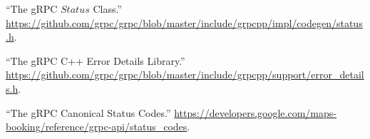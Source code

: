 \documentclass[11pt]{article}
\begin{document}
{{\begin{thebibliography}{45}
\mdbibitemlabel{{}[38]}\textquotedblleft{}The gRPC $Status$ Class.\textquotedblright{} \href{https://github.com/grpc/grpc/blob/master/include/grpcpp/impl/codegen/status.h}{{\ttfamily https://\hspace{0pt}github.\hspace{0pt}com/\hspace{0pt}grpc/\hspace{0pt}grpc/\hspace{0pt}blob/\hspace{0pt}master/\hspace{0pt}include/\hspace{0pt}grpcpp/\hspace{0pt}impl/\hspace{0pt}codegen/\hspace{0pt}status.\hspace{0pt}h}}.\label{grpcstatus}%

\mdbibitemlabel{{}[39]}\textquotedblleft{}The gRPC C++ Error Details Library.\textquotedblright{} \href{https://github.com/grpc/grpc/blob/master/include/grpcpp/support/error_details.h}{{\ttfamily https://\hspace{0pt}github.\hspace{0pt}com/\hspace{0pt}grpc/\hspace{0pt}grpc/\hspace{0pt}blob/\hspace{0pt}master/\hspace{0pt}include/\hspace{0pt}grpcpp/\hspace{0pt}support/\hspace{0pt}error\_\hspace{0pt}details.\hspace{0pt}h}}.\label{grpcerrordetails}%

\mdbibitemlabel{{}[40]}\textquotedblleft{}The gRPC Canonical Status Codes.\textquotedblright{} \href{https://developers.google.com/maps-booking/reference/grpc-api/status_codes}{{\ttfamily https://\hspace{0pt}developers.\hspace{0pt}google.\hspace{0pt}com/\hspace{0pt}maps-\hspace{0pt}booking/\hspace{0pt}reference/\hspace{0pt}grpc-\hspace{0pt}api/\hspace{0pt}status\_\hspace{0pt}codes}}.\label{grpcstatuscodes}%


\end{thebibliography}}}
\end{document}
